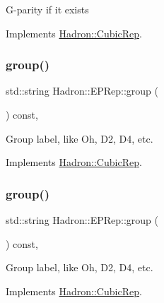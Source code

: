 G-\/parity if it exists 

Implements \mbox{\hyperlink{structHadron_1_1CubicRep_a52104e43266d1614c00bbd1c3b395458}{Hadron\+::\+Cubic\+Rep}}.

\mbox{\label{structHadron_1_1EPRep_a616ca775839a0a87e82fbef0de6f1cab}} 
\subsubsection{\texorpdfstring{group()}{group()}\hspace{0.1cm}{\footnotesize\ttfamily [1/3]}}
{\footnotesize\ttfamily std\+::string Hadron\+::\+E\+P\+Rep\+::group (\begin{DoxyParamCaption}{ }\end{DoxyParamCaption}) const\hspace{0.3cm}{\ttfamily [inline]}, {\ttfamily [virtual]}}

Group label, like Oh, D2, D4, etc. 

Implements \mbox{\hyperlink{structHadron_1_1CubicRep_a0748f11ec87f387062c8e8981339a29c}{Hadron\+::\+Cubic\+Rep}}.

\mbox{\label{structHadron_1_1EPRep_a616ca775839a0a87e82fbef0de6f1cab}} 
\subsubsection{\texorpdfstring{group()}{group()}\hspace{0.1cm}{\footnotesize\ttfamily [2/3]}}
{\footnotesize\ttfamily std\+::string Hadron\+::\+E\+P\+Rep\+::group (\begin{DoxyParamCaption}{ }\end{DoxyParamCaption}) const\hspace{0.3cm}{\ttfamily [inline]}, {\ttfamily [virtual]}}

Group label, like Oh, D2, D4, etc. 

Implements \mbox{\hyperlink{structHadron_1_1CubicRep_a0748f11ec87f387062c8e8981339a29c}{Hadron\+::\+Cubic\+Rep}}.

\mbox{\label{structHadron_1_1EPRep_a616ca775839a0a87e82fbef0de6f1cab}} 
